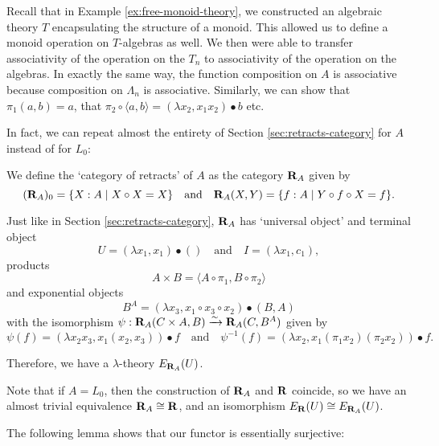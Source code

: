\begin{remark}
  Recall that in Example \ref{ex:free-monoid-theory}, we constructed an algebraic theory $ T $ encapsulating the structure of a monoid. This allowed us to define a monoid operation on $ T $-algebras as well. We then were able to transfer associativity of the operation on the $ T_n $ to associativity of the operation on the algebras. In exactly the same way, the function composition on $ A $ is associative because composition on $ \Lambda_n $ is associative. Similarly, we can show that $ \pi_1 (a, b) = a $, that $ \pi_2 \circ \langle a, b \rangle = (\lambda x_2, x_1 x_2) \bullet b $ etc.
\end{remark}

In fact, we can repeat almost the entirety of Section \ref{sec:retracts-category} for $ A $ instead of for $ L_0 $:
\begin{definition}
  We define the `category of retracts' of $ A $ as the category $ \mathbf{R}_A $ given by
  \[ (\mathbf{R}_A)_0 = \{ X : A \mid X \circ X = X \} \quad \text{and} \quad \mathbf{R}_A(X, Y) = \{ f : A \mid Y \circ f \circ X = f \}. \]
\end{definition}
Just like in Section \ref{sec:retracts-category}, $ \mathbf{R}_A $ has `universal object' and terminal object
\[ U = (\lambda x_1, x_1) \bullet () \quad \text{and} \quad I = (\lambda x_1, c_1), \]
products
\[ A \times B = \langle A \circ \pi_1, B \circ \pi_2 \rangle \]
and exponential objects
\[ B^A = (\lambda x_3, x_1 \circ x_3 \circ x_2) \bullet (B, A) \]
with the isomorphism $ \psi: \mathbf{R}_A(C \times A, B) \xrightarrow \sim \mathbf{R}_A(C, B^A) $
given by
\[ \psi(f) = (\lambda x_2 x_3, x_1 (x_2, x_3)) \bullet f \quad \text{and} \quad \psi^{-1}(f) = (\lambda x_2, x_1 (\pi_1 x_2) (\pi_2 x_2)) \bullet f. \]

Therefore, we have a $ \lambda $-theory $ E_{\mathbf{R}_A}(U) $.

\begin{remark}
  Note that if $ A = L_0 $, then the construction of $ \mathbf{R}_A $ and $ \mathbf{R} $ coincide, so we have an almost trivial equivalence $ \mathbf{R}_A \cong \mathbf{R} $, and an isomorphism $ E_{\mathbf{R}}(U) \cong E_{\mathbf{R}_A}(U) $.
\end{remark}

The following lemma shows that our functor is essentially surjective:


